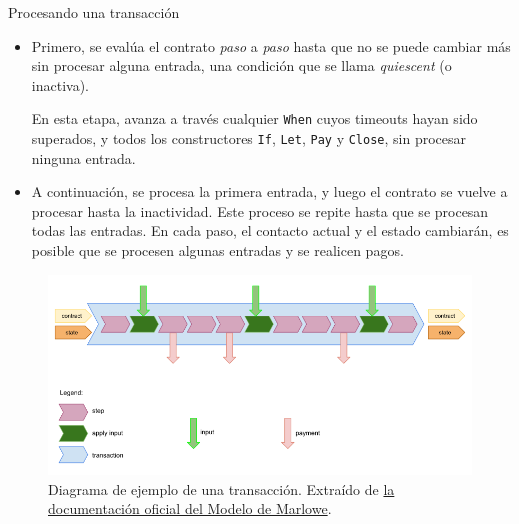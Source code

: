 \documentclass{beamer}
\begin{document}
\begin{frame}{Procesando una transacción}
\begin{itemize}
    \item Primero, se evalúa el contrato \textit{paso} a \textit{paso} hasta que no se puede cambiar más sin procesar alguna entrada, una condición que se llama \textit{quiescent} (o inactiva).

    En esta etapa, avanza a través cualquier \texttt{When} cuyos timeouts hayan sido superados, y todos los constructores \texttt{If}, \texttt{Let}, \texttt{Pay} y \texttt{Close}, sin procesar ninguna entrada.
    \bigskip

    \pause
    \item A continuación, se procesa la primera entrada, y luego el contrato se vuelve a procesar hasta la inactividad. Este proceso se repite hasta que se procesan todas las entradas. En cada paso, el contacto actual y el estado cambiarán, es posible que se procesen algunas entradas y se realicen pagos.
\end{itemize}
\end{frame}

\begin{frame}

\begin{figure}[H]
    \centering
    \includegraphics[width=\textwidth]{Transaccion.png}
    \caption[Diagrama de ejemplo de una transacción.]{Diagrama de ejemplo de una transacción. Extraído de \href{https://play.marlowe-finance.io/doc/marlowe/tutorials/marlowe-model.html}{la documentación oficial del Modelo de Marlowe}.}\label{fig:Transaccion}
\end{figure}

\end{frame}
\end{document}
